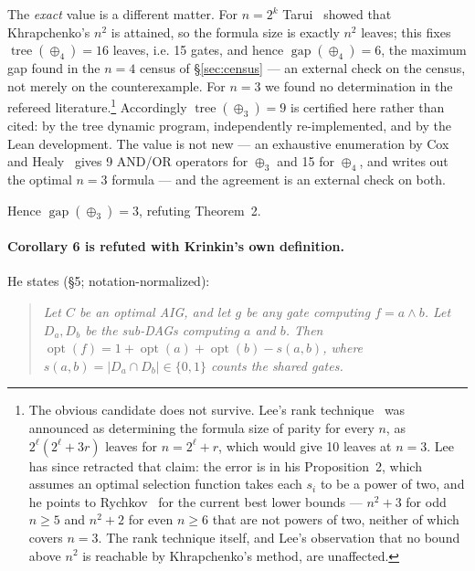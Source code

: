 \documentclass[11pt]{article}
\DeclareMathOperator{\opt}{opt}
\DeclareMathOperator{\tree}{tree}
\DeclareMathOperator{\gapop}{gap}
\theoremstyle{plain}
\begin{document}
\begin{itemize}
  The \emph{exact} value is a different matter. For $n = 2^k$ Tarui~\cite{tarui2010} showed that
  Khrapchenko's $n^2$ is attained, so the formula size is exactly $n^2$ leaves; this fixes
  $\tree(\oplus_4) = 16$ leaves, i.e. 15 gates, and hence $\gapop(\oplus_4) = 6$, the maximum gap
  found in the $n = 4$ census of \S\ref{sec:census} --- an external check on the census, not
  merely on the counterexample. For $n = 3$ we found no determination in the refereed
  literature.\footnote{The obvious candidate does not survive. Lee's rank
  technique~\cite{lee2007} was announced as determining the formula size of parity for every $n$,
  as $2^{\ell}(2^{\ell}+3r)$ leaves for $n = 2^{\ell}+r$, which would give 10 leaves at $n = 3$.
  Lee has since retracted that claim: the error is in his Proposition~2, which assumes an optimal
  selection function takes each $s_i$ to be a power of two, and he points to
  Rychkov~\cite{rychkov1994} for the current best lower bounds --- $n^2+3$ for odd $n \ge 5$ and
  $n^2+2$ for even $n \ge 6$ that are not powers of two, neither of which covers $n = 3$. The
  rank technique itself, and Lee's observation that no bound above $n^2$ is reachable by
  Khrapchenko's method, are unaffected.} Accordingly $\tree(\oplus_3) = 9$ is certified here
  rather than cited: by the tree dynamic program, independently re-implemented, and by the Lean
  development. The value is not new --- an exhaustive enumeration by Cox and Healy~\cite{cox2011}
  gives 9 AND/OR operators for $\oplus_3$ and 15 for $\oplus_4$, and writes out the optimal
  $n = 3$ formula --- and the agreement is an external check on both.
\end{itemize}

Hence $\gapop(\oplus_3) = 3$, refuting Theorem~2.

\paragraph{Corollary 6 is refuted with Krinkin's own definition.} He states (\S5;
notation-normalized):

\begin{quote}
\itshape
Let $C$ be an optimal AIG, and let $g$ be any gate computing $f = a \wedge b$. Let $D_a, D_b$ be the
sub-DAGs computing $a$ and $b$. Then $\opt(f) = 1 + \opt(a) + \opt(b) - s(a,b)$, where
$s(a,b) = |D_a \cap D_b| \in \{0,1\}$ counts the shared gates.
\end{quote}
\end{document}
